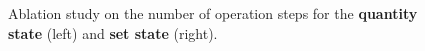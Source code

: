 \begin{figure}[t!]
    \centering
    \begin{subfigure}{0.49\columnwidth}
        \resizebox{\textwidth}{!}{}
    \end{subfigure}
    \begin{subfigure}{0.49\columnwidth}
        \resizebox{\textwidth}{!}{}
    \end{subfigure}
    \caption{Ablation study on the number of operation steps for the \textbf{quantity state} (left) and\textbf{ set state }(right).}
    \label{fig:ablation_state_step}
\end{figure}

